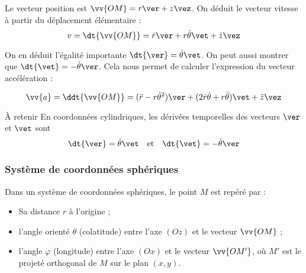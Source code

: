 \documentclass{cours}
\begin{document}
Le vecteur position est $\vv{OM} = r\ver + z\vez$. On déduit le vecteur vitesse à partir du déplacement élémentaire :
\begin{equation}
v = \dt{\vv{OM}} = \dot{r}\ver + r \dot{\theta}\vet + \dot{z}\vez
\end{equation}


On en déduit l'égalité importante $\dt{\ver} = \dot{\theta}\vet$. On peut aussi montrer que $\dt{\vet} = -\dot{\theta}\ver$. Cela nous permet de calculer l'expression du vecteur accélération :

\begin{equation}
\vv{a} = \ddt{\vv{OM}} = (\ddot{r}-r \dot{\theta}^2)\ver + (2 \dot{r}\dot{\theta} + r \ddot{\theta})\vet + \ddot{z}\vez
\end{equation}

\begin{loi}{À retenir}
  En coordonnées cylindriques, les dérivées temporelles des vecteurs $\ver$ et $\vet$ sont
  \begin{equation}
    \dt{\ver} = \dot{\theta}\vet \quad \text{et} \quad \dt{\vet} = -\dot{\theta}\ver
  \end{equation}
\end{loi}



\subsubsection{Système de coordonnées sphériques}%
\label{ssub:systeme_de_coordonnees_sphériques}

Dans un système de coordonnées sphériques, le point $M$ est repéré par :
\begin{itemize}
  \item Sa distance $r$ à l'origine ;
  \item l'angle orienté $\theta$ (colatitude) entre l'axe $(Oz)$ et le vecteur $\vv{OM}$ ;
  \item l'angle $\varphi$ (longitude) entre l'axe $(Ox)$ et le vecteur $\vv{OM'}$, où $M'$ est le projeté orthogonal de $M$ sur le plan $(x, y)$.  

\end{itemize}
\end{document}
